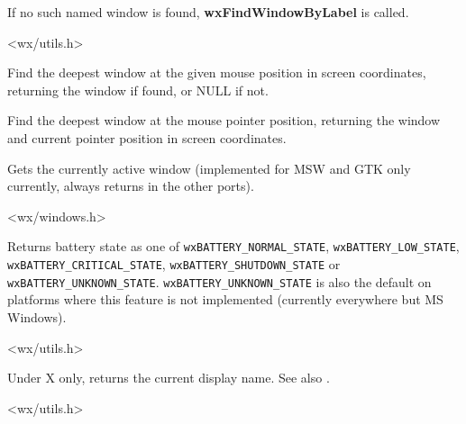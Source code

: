 If no such named window is found, {\bf wxFindWindowByLabel} is called.


<wx/utils.h>


\label{wxfindwindowatpoint}


Find the deepest window at the given mouse position in screen coordinates,
returning the window if found, or NULL if not.


\label{wxfindwindowatpointer}


Find the deepest window at the mouse pointer position, returning the window
and current pointer position in screen coordinates.


\label{wxgetactivewindow}


Gets the currently active window (implemented for MSW and GTK only currently,
always returns \NULL in the other ports).


<wx/windows.h>


\label{wxgetbatterystate}


Returns battery state as one of \texttt{wxBATTERY\_NORMAL\_STATE},
\texttt{wxBATTERY\_LOW\_STATE}, \texttt{wxBATTERY\_CRITICAL\_STATE},
\texttt{wxBATTERY\_SHUTDOWN\_STATE} or \texttt{wxBATTERY\_UNKNOWN\_STATE}.
\texttt{wxBATTERY\_UNKNOWN\_STATE} is also the default on platforms where
this feature is not implemented (currently everywhere but MS Windows).


<wx/utils.h>


\label{wxgetdisplayname}


Under X only, returns the current display name. See also .


<wx/utils.h>


